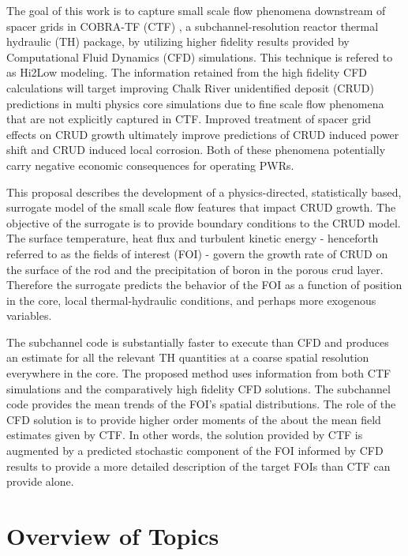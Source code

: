 The goal of this work is to capture small scale flow phenomena downstream of
spacer grids in COBRA-TF (CTF) \cite{salko12}, a subchannel-resolution reactor
thermal hydraulic (TH) package, by utilizing higher fidelity results provided
by Computational Fluid Dynamics (CFD) simulations.  This technique is refered to as Hi2Low modeling.  
The information retained from the high
fidelity CFD calculations will target improving Chalk River unidentified deposit (CRUD) predictions in
multi physics core simulations due to fine scale flow phenomena that are not
explicitly captured in CTF.  
Improved treatment of spacer grid
effects on CRUD growth ultimately improve predictions of CRUD induced power shift
and CRUD induced local corrosion.  Both of these phenomena potentially carry negative economic consequences for operating PWRs.

This proposal describes the development of a physics-directed, statistically
based, surrogate model of the small scale flow features that impact CRUD
growth.   
The objective of the surrogate is to provide boundary conditions to the CRUD
model.  The surface temperature, heat flux and
turbulent kinetic energy - henceforth referred to as the fields of interest (FOI) - govern the growth rate of CRUD on the surface
of the rod and the precipitation of boron in the porous crud layer.
Therefore the surrogate predicts the behavior of the FOI as a function
of position in the core, local thermal-hydraulic conditions, and perhaps 
more exogenous variables. 

The subchannel code is substantially faster to execute than CFD and produces an estimate for
all the relevant TH quantities at a coarse spatial resolution everywhere in the core.  The proposed method uses information from both CTF simulations and the comparatively high fidelity CFD solutions.
The subchannel code provides the mean trends of the 
FOI's spatial distributions.  The role of the CFD solution is to provide
higher order moments of the about the mean field estimates given by CTF.  
In other words, the solution provided by CTF is augmented by a
predicted stochastic component of the FOI informed by CFD results to provide a more detailed description of the target FOIs than CTF can provide alone.  


\section{Overview of Topics}

